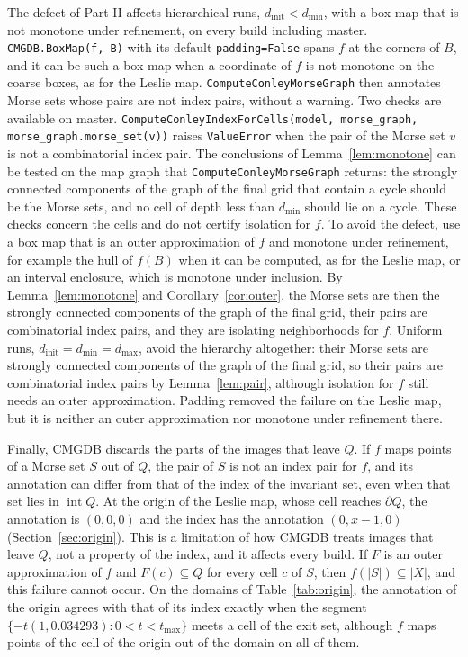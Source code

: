 \documentclass[11pt]{article}
\theoremstyle{plain}
\theoremstyle{definition}
\theoremstyle{remark}
\DeclareMathOperator{\interior}{int}
\newcommand{\dmin}{d_{\min}}
\newcommand{\dmax}{d_{\max}}
\newcommand{\dinit}{d_{\mathrm{init}}}
\newcommand{\code}[1]{\texttt{#1}}
\begin{document}
The defect of Part II affects hierarchical runs, $\dinit<\dmin$, with a box map that is not monotone under refinement, on every build including master. \code{CMGDB.BoxMap(f, B)} with its default \code{padding=False} spans $f$ at the corners of $B$, and it can be such a box map when a coordinate of $f$ is not monotone on the coarse boxes, as for the Leslie map. \code{ComputeConleyMorseGraph} then annotates Morse sets whose pairs are not index pairs, without a warning. Two checks are available on master. \code{ComputeConleyIndexForCells(model, morse\_graph, morse\_graph.morse\_set(v))} raises \code{ValueError} when the pair of the Morse set $v$ is not a combinatorial index pair. The conclusions of Lemma~\ref{lem:monotone} can be tested on the map graph that \code{ComputeConleyMorseGraph} returns: the strongly connected components of the graph of the final grid that contain a cycle should be the Morse sets, and no cell of depth less than $\dmin$ should lie on a cycle. These checks concern the cells and do not certify isolation for $f$. To avoid the defect, use a box map that is an outer approximation of $f$ and monotone under refinement, for example the hull of $f(B)$ when it can be computed, as for the Leslie map, or an interval enclosure, which is monotone under inclusion. By Lemma~\ref{lem:monotone} and Corollary~\ref{cor:outer}, the Morse sets are then the strongly connected components of the graph of the final grid, their pairs are combinatorial index pairs, and they are isolating neighborhoods for $f$. Uniform runs, $\dinit=\dmin=\dmax$, avoid the hierarchy altogether: their Morse sets are strongly connected components of the graph of the final grid, so their pairs are combinatorial index pairs by Lemma~\ref{lem:pair}, although isolation for $f$ still needs an outer approximation. Padding removed the failure on the Leslie map, but it is neither an outer approximation nor monotone under refinement there.

Finally, CMGDB discards the parts of the images that leave $Q$. If $f$ maps points of a Morse set $S$ out of $Q$, the pair of $S$ is not an index pair for $f$, and its annotation can differ from that of the index of the invariant set, even when that set lies in $\interior Q$. At the origin of the Leslie map, whose cell reaches $\partial Q$, the annotation is $(0,0,0)$ and the index has the annotation $(0,x-1,0)$ (Section~\ref{sec:origin}). This is a limitation of how CMGDB treats images that leave $Q$, not a property of the index, and it affects every build. If $F$ is an outer approximation of $f$ and $F(c)\subseteq Q$ for every cell $c$ of $S$, then $f(|S|)\subseteq|X|$, and this failure cannot occur. On the domains of Table~\ref{tab:origin}, the annotation of the origin agrees with that of its index exactly when the segment $\{-t(1,0.034293):0<t<t_{\max}\}$ meets a cell of the exit set, although $f$ maps points of the cell of the origin out of the domain on all of them.
\end{document}
